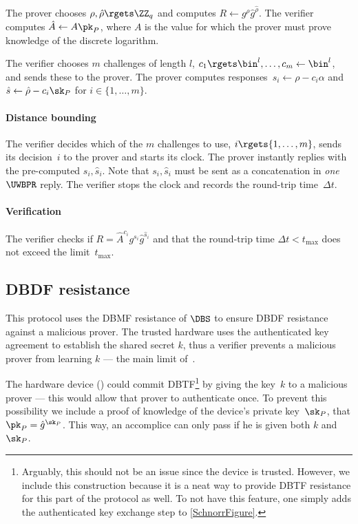 The prover chooses \(\rho, \hat\rho\rgets \ZZ_q\) and computes \(R\gets g^\rho 
  \hat g^{\hat\rho}\).
The verifier computes \(\hat A\gets A \pk_P\), where \(A\) is the value for 
which the prover must prove knowledge of the discrete logarithm.

The verifier chooses \(m\) challenges of length \(l\), \(c_1\rgets \bin^l, 
  \dotsc, c_m\gets \bin^l\), and sends these to the prover.
The prover computes responses~\(s_i\gets \rho - c_i\alpha\) and \(\hat s\gets 
  \hat\rho - c_i\sk_P\) for \(i\in \{1, \dotsc, m\}\).

\paragraph*{Distance bounding}

The verifier decides which of the \(m\) challenges to use, \(i\rgets \{1, 
  \dotsc, m\}\), sends its decision~\(i\) to the prover and starts its clock.
The prover instantly replies with the pre-computed \(s_i, \hat s_i\).
Note that \(s_i, \hat s_i\) must be sent as a concatenation in \emph{one} 
\(\UWBPR\) reply.
The verifier stops the clock and records the round-trip time~\(\Delta t\).

\paragraph*{Verification}

The verifier checks if \(R = \hat A^{c_i} g^{s_i} \hat g^{\hat s_i}\) and that 
the round-trip time \(\Delta t < t_{\max}\) does not exceed the 
limit~\(t_{\max}\).


\subsection{\acs*{DBDF} resistance}

This protocol uses the \ac{DBMF} resistance of \(\DBS\) to ensure \ac{DBDF} 
resistance against a malicious prover.
The trusted hardware uses the authenticated key agreement to establish the 
shared secret \(k\), thus a verifier prevents a malicious prover from learning 
\(k\) --- the main limit of~\cite{UWBPR}.

The hardware device (\DBSHW) could commit \ac{DBTF}\footnote{%
  Arguably, this should not be an issue since the device is trusted.
  However, we include this construction because it is a neat way to provide 
  \ac{DBTF} resistance for this part of the protocol as well.
  To not have this feature, one simply adds the authenticated key exchange step 
  to \cref{SchnorrFigure}.
} by giving the key~\(k\) to a malicious prover --- this would allow that 
prover to authenticate once.
To prevent this possibility we include a proof of knowledge of the device's 
private key~\(\sk_P\), \ie that \(\pk_P = \hat g^{\sk_P}\).
This way, an accomplice can only pass if he is given both \(k\) and \(\sk_P\).


